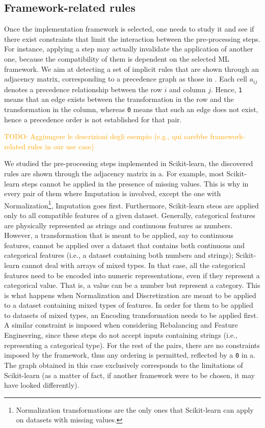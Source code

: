 \subsection{Framework-related rules}
\label{effective-ssec:rules-framework}

Once the implementation framework is selected, one needs to study it and see if there exist constraints that limit the interaction between the pre-processing steps.
For instance, applying a step may actually invalidate the application of another one, because the compatibility of them is dependent on the selected ML framework.
We aim at detecting a set of implicit rules that are shown through an adjacency matrix, corresponding to a precedence graph as those in .
Each cell $a_{ij}$ denotes a precedence relationship between the row $i$ and column $j$.
Hence, \texttt{1} means that an edge exists between the transformation in the row and the transformation in the column, whereas \texttt{0} means that such an edge does not exist, hence a precedence order is not established for that pair.

\textcolor{orange}{TODO: Aggiungere le descrizioni degli esempio (e.g., qui sarebbe framework-related rules in our use case)}
\begin{example}
We studied the pre-processing steps implemented in Scikit-learn, the discovered rules are shown through the adjacency matrix in a.
For example, most Scikit-learn steps cannot be applied in the presence of missing values.
This is why in every pair of them where Imputation is involved, except the one with Normalization\footnote{Normalization transformations are the only ones that Scikit-learn can apply on datasets with missing values.}, Imputation goes first.
Furthermore, Scikit-learn steos are applied only to all compatible features of a given dataset.
Generally, categorical features are physically represented as strings and continuous features as numbers.
However, a transformation that is meant to be applied, say to continuous features, cannot be applied over a dataset that contains both continuous and categorical features (i.e., a dataset containing both numbers and strings); Scikit-learn cannot deal with arrays of mixed types.
In that case, all the categorical features need to be encoded into numeric representations, even if they represent a categorical value.
That is, a value can be a number but represent a category.
This is what happens when Normalization and Discretization are meant to be applied to a dataset containing mixed types of features.
In order for them to be applied to datasets of mixed types, an Encoding transformation needs to be applied first.
A similar constraint is imposed when considering Rebalancing and Feature Engineering, since these steps do not accept inputs containing strings (i.e., representing a categorical type).
For the rest of the pairs, there are no constraints imposed by the framework, thus any ordering is permitted, reflected by a \texttt{0} in a.
The graph obtained in this case exclusively corresponds to the limitations of Scikit-learn (as a matter of fact, if another framework were to be chosen, it may have looked differently).
\end{example}

